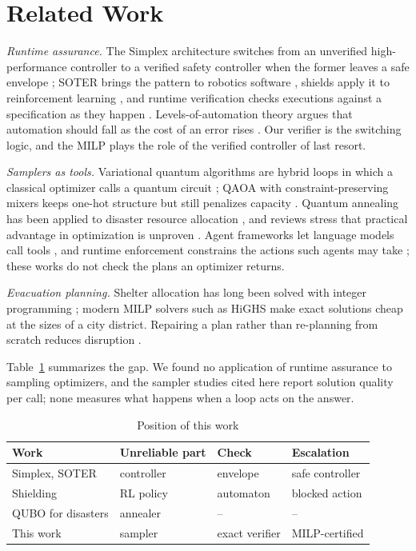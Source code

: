 \documentclass[conference]{IEEEtran}
\begin{document}
\section{Related Work}
\textit{Runtime assurance.} The Simplex architecture switches from an unverified high-performance controller to a verified safety controller when the former leaves a safe envelope \cite{Sha2001}; SOTER brings the pattern to robotics software \cite{Desai2019}, shields apply it to reinforcement learning \cite{Alshiekh2018}, and runtime verification checks executions against a specification as they happen \cite{Leucker2009}. Levels-of-automation theory argues that automation should fall as the cost of an error rises \cite{Parasuraman2000}. Our verifier is the switching logic, and the MILP plays the role of the verified controller of last resort.

\textit{Samplers as tools.} Variational quantum algorithms are hybrid loops in which a classical optimizer calls a quantum circuit \cite{McClean2016}; QAOA with constraint-preserving mixers keeps one-hot structure but still penalizes capacity \cite{Hadfield2019,WangZ2020}. Quantum annealing has been applied to disaster resource allocation \cite{Cadelina2024}, and reviews stress that practical advantage in optimization is unproven \cite{Abbas2024}. Agent frameworks let language models call tools \cite{Yao2023,Schick2023}, and runtime enforcement constrains the actions such agents may take \cite{WangH2026}; these works do not check the plans an optimizer returns.

\textit{Evacuation planning.} Shelter allocation has long been solved with integer programming \cite{Sherali1991}; modern MILP solvers such as HiGHS \cite{Huangfu2018} make exact solutions cheap at the sizes of a city district. Repairing a plan rather than re-planning from scratch reduces disruption \cite{Fox2006}.

Table~\ref{tab:pos} summarizes the gap. We found no application of runtime assurance to sampling optimizers, and the sampler studies cited here report solution quality per call; none measures what happens when a loop acts on the answer.

\begin{table}[t]
\caption{Position of this work}
\label{tab:pos}
\centering
\footnotesize
\setlength{\tabcolsep}{2.4pt}
\begin{tabular}{llll}
\toprule
Work & Unreliable part & Check & Escalation\\
\midrule
Simplex, SOTER \cite{Sha2001,Desai2019} & controller & envelope & safe controller\\
Shielding \cite{Alshiekh2018} & RL policy & automaton & blocked action\\
QUBO for disasters \cite{Cadelina2024} & annealer & -- & --\\
This work & sampler & exact verifier & MILP-certified\\
\bottomrule
\end{tabular}
\end{table}
\end{document}
